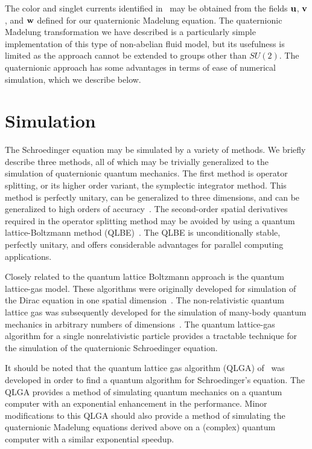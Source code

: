 \documentclass[a4paper,aps,prd,preprint,groupedaddress]{revtex4}
\newcommand{\bfu}{{\bf u}}
\newcommand{\bfv}{{\bf v}}
\newcommand{\bfw}{{\bf w}}
\begin{document}
The color and singlet currents identified in~\cite{bib:jackiw2} may be obtained from the fields $\bfu$, $\bfv$, and $\bfw$ defined for our quaternionic Madelung equation. The quaternionic Madelung transformation we have described is a particularly simple implementation of this type of non-abelian fluid model, but its usefulness is limited as the approach cannot be extended to groups other than $SU(2)$. The quaternionic approach has some advantages in terms of  ease of numerical simulation, which we describe below.

\section{Simulation}

The Schroedinger equation may be simulated by a variety of methods. We briefly describe three methods, all of which may be trivially generalized to the simulation of quaternionic quantum mechanics.  The first method is operator splitting, or its higher order variant, the symplectic integrator method.  This method is perfectly unitary, can be generalized to three dimensions, and can be generalized to high orders of accuracy~\cite{bib:opsplit1,bib:opsplit2,bib:opsplit3,bib:opsplit4,bib:opsplit5,bib:opsplit6}. The second-order spatial derivatives required in the operator splitting method may be avoided by using a quantum lattice-Boltzmann method (QLBE)~\cite{bib:qlbe1,bib:qlbe2, bib:qlbe3}. The QLBE is unconditionally stable, perfectly unitary, and offers considerable advantages for parallel computing applications. 

Closely related to the quantum lattice Boltzmann approach is the quantum lattice-gas model. These algorithms were originally developed for simulation of the Dirac equation in one spatial dimension~\cite{bib:meyer1,bib:meyer2,bib:meyer3,bib:meyer4}. The non-relativistic quantum lattice gas was subsequently developed for the simulation of many-body quantum mechanics in arbitrary numbers of dimensions~\cite{bib:bogwash}. The quantum lattice-gas algorithm for a single nonrelativistic particle provides a tractable technique for the simulation of the quaternionic Schroedinger equation.

It should be noted that the quantum lattice gas algorithm (QLGA) of~\cite{bib:bogwash} was developed in order to find a quantum algorithm for Schroedinger's equation. The QLGA provides a method of simulating quantum mechanics on a quantum computer with an exponential enhancement in the performance. Minor modifications to this QLGA should also provide a method of simulating the quaternionic Madelung equations derived above on a (complex) quantum computer with a similar exponential speedup.
\end{document}
